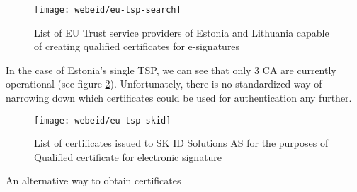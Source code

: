 \begin{figure}
    \centering
    \texttt{[image: webeid/eu-tsp-search]}
    \caption{List of EU Trust service providers of Estonia and Lithuania capable of creating qualified certificates for e-signatures}
    \label{fig:eu-tsp-list}
\end{figure}

In the case of Estonia's single TSP, we can see that only 3 CA are currently operational (see figure \ref{fig:eu-tsp-skid}). Unfortunately, there is no standardized way of narrowing down which certificates could be used for authentication any further.

\begin{figure}
    \centering
    \texttt{[image: webeid/eu-tsp-skid]}
    \caption{List of certificates issued to SK ID Solutions AS for the purposes of Qualified certificate for electronic signature}
    \label{fig:eu-tsp-skid}
\end{figure}

An alternative way to obtain certificates 

